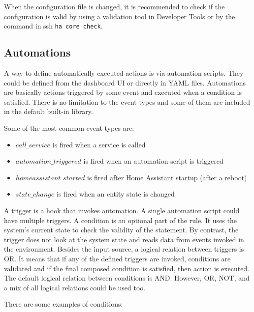 \documentclass[fleqn,10pt]{olplainarticle}
\begin{document}
\vskip10pt

When the configuration file is changed, it is recommended to check if the configuration is valid by using a validation tool in Developer Tools or by the command in ssh \texttt{ha core check}.

\subsection{Automations}

A way to define automatically executed actions is via automation scripts. They could be defined from the dashboard UI or directly in YAML files. Automations are basically actions triggered by some event and executed when a condition is satisfied. There is no limitation to the event types and some of them are included in the default built-in library.

\vskip10pt

Some of the most common event types are:

\vskip10pt

\begin{itemize}
    \item $call\_service$ is fired when a service is called
    \item $automation\_triggered$ is fired when an automation script is triggered
    \item $homeassistant\_started$ is fired after Home Assistant startup (after a reboot)
    \item $state\_change$ is fired when an entity state is changed
\end{itemize}

A trigger is a hook that invokes automation. A single automation script could have multiple triggers. A condition is an optional part of the rule. It uses the system’s current state to check the validity of the statement. By contrast, the trigger does not look at the system state and reads data from events invoked in the environment. Besides the input source, a logical relation between triggers is OR. It means that if any of the defined triggers are invoked, conditions are validated and if the final composed condition is satisfied, then action is executed. The default logical relation between conditions is AND. However, OR, NOT, and a mix of all logical relations could be used too.

\vskip10pt

There are some examples of conditions:
\end{document}
